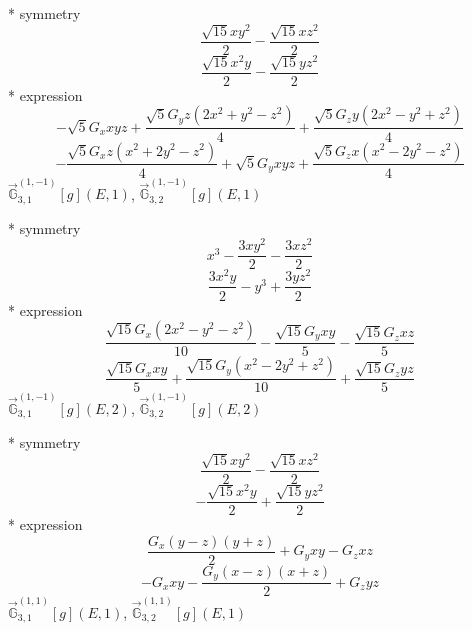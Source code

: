 \documentclass[fleqn,8pt]{jsarticle}
\begin{document}
\noindent\quad ** symmetry
\begin{dmath*}
\frac{\sqrt{15} x y^{2}}{2} - \frac{\sqrt{15} x z^{2}}{2}
\end{dmath*}
\begin{dmath*}
\frac{\sqrt{15} x^{2} y}{2} - \frac{\sqrt{15} y z^{2}}{2}
\end{dmath*}
\noindent\quad ** expression
\begin{dmath*}
- \sqrt{5} G_{x} x y z + \frac{\sqrt{5} G_{y} z \left(2 x^{2} + y^{2} - z^{2}\right)}{4} + \frac{\sqrt{5} G_{z} y \left(2 x^{2} - y^{2} + z^{2}\right)}{4}
\end{dmath*}
\begin{dmath*}
- \frac{\sqrt{5} G_{x} z \left(x^{2} + 2 y^{2} - z^{2}\right)}{4} + \sqrt{5} G_{y} x y z + \frac{\sqrt{5} G_{z} x \left(x^{2} - 2 y^{2} - z^{2}\right)}{4}
\end{dmath*}
\noindent\quad $\vec{\mathbb{G}}_{3,1}^{(1,-1)}[g](E,1)$, $\vec{\mathbb{G}}_{3,2}^{(1,-1)}[g](E,1)$

\noindent\quad ** symmetry
\begin{dmath*}
x^{3} - \frac{3 x y^{2}}{2} - \frac{3 x z^{2}}{2}
\end{dmath*}
\begin{dmath*}
\frac{3 x^{2} y}{2} - y^{3} + \frac{3 y z^{2}}{2}
\end{dmath*}
\noindent\quad ** expression
\begin{dmath*}
\frac{\sqrt{15} G_{x} \left(2 x^{2} - y^{2} - z^{2}\right)}{10} - \frac{\sqrt{15} G_{y} x y}{5} - \frac{\sqrt{15} G_{z} x z}{5}
\end{dmath*}
\begin{dmath*}
\frac{\sqrt{15} G_{x} x y}{5} + \frac{\sqrt{15} G_{y} \left(x^{2} - 2 y^{2} + z^{2}\right)}{10} + \frac{\sqrt{15} G_{z} y z}{5}
\end{dmath*}
\noindent\quad $\vec{\mathbb{G}}_{3,1}^{(1,-1)}[g](E,2)$, $\vec{\mathbb{G}}_{3,2}^{(1,-1)}[g](E,2)$

\noindent\quad ** symmetry
\begin{dmath*}
\frac{\sqrt{15} x y^{2}}{2} - \frac{\sqrt{15} x z^{2}}{2}
\end{dmath*}
\begin{dmath*}
- \frac{\sqrt{15} x^{2} y}{2} + \frac{\sqrt{15} y z^{2}}{2}
\end{dmath*}
\noindent\quad ** expression
\begin{dmath*}
\frac{G_{x} \left(y - z\right) \left(y + z\right)}{2} + G_{y} x y - G_{z} x z
\end{dmath*}
\begin{dmath*}
- G_{x} x y - \frac{G_{y} \left(x - z\right) \left(x + z\right)}{2} + G_{z} y z
\end{dmath*}
\noindent\quad $\vec{\mathbb{G}}_{3,1}^{(1,1)}[g](E,1)$, $\vec{\mathbb{G}}_{3,2}^{(1,1)}[g](E,1)$
\end{document}
